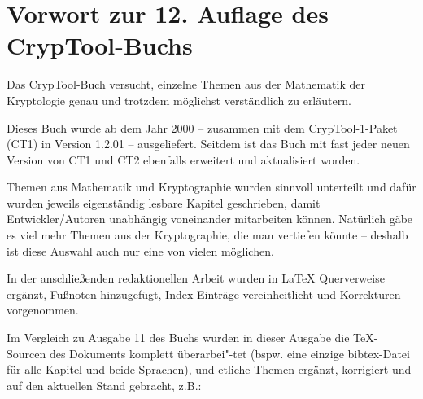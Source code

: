 %

\clearpage
\chapter*{Vorwort zur 12. Auflage des CrypTool-Buchs}
\setcounter{secnumdepth}{4}  %

Das CrypTool-Buch versucht, einzelne Themen aus der Mathematik der Kryptologie
genau und trotzdem möglichst verständlich zu erläutern.

Dieses Buch wurde ab dem Jahr 2000 -- zusammen mit dem CrypTool-1-Paket
(CT1) in Version 1.2.01 -- ausgeliefert.
Seitdem ist das Buch mit fast jeder neuen Version von CT1 und CT2 ebenfalls erweitert
und aktualisiert worden.

Themen aus Mathematik und Kryptographie wurden sinnvoll unterteilt und dafür
wurden jeweils eigenständig lesbare Kapitel geschrieben, damit
Entwickler/Autoren unabhängig voneinander mitarbeiten können. Natürlich gäbe
es viel mehr Themen aus der Kryptographie, die man vertiefen könnte -- deshalb
ist diese Auswahl auch nur eine von vielen möglichen.

In der anschließenden redaktionellen Arbeit wurden in LaTeX Querverweise ergänzt,
Fußnoten hinzugefügt, Index-Einträge vereinheitlicht und Korrekturen vorgenommen.

Im Vergleich zu Ausgabe 11 des Buchs wurden in dieser Ausgabe
die TeX-Sourcen des Dokuments komplett überarbei"-tet (bspw. eine einzige
bibtex-Datei für alle Kapitel und beide Sprachen), und
etliche Themen ergänzt, korrigiert und auf den aktuellen Stand gebracht, z.B.:


